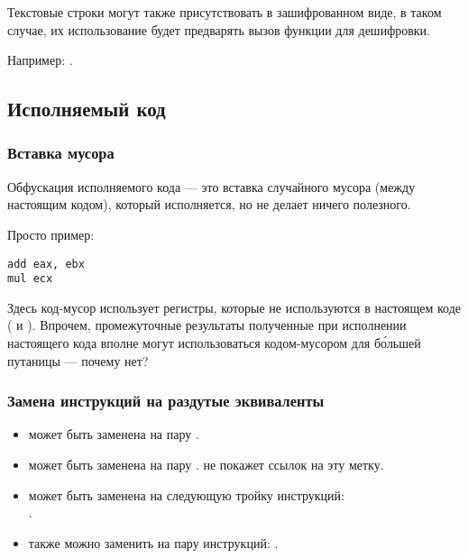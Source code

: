 Текстовые строки могут также присутствовать в зашифрованном виде, в таком случае,
их использование будет предварять вызов функции для дешифровки.

Например: .

\subsection{Исполняемый код}

\subsubsection{Вставка мусора}

Обфускация исполняемого кода --- это вставка случайного мусора (между настоящим кодом), который исполняется, но не делает
ничего полезного.

Просто пример:

\begin{lstlisting}[caption=оригинальный код,style=customasm]
add	eax, ebx
mul	ecx
\end{lstlisting}



Здесь код-мусор использует регистры, которые не используются в настоящем коде ( и ).
Впрочем, промежуточные результаты полученные при исполнении настоящего кода вполне могут использоваться
кодом-мусором для б\'{о}льшей путаницы --- почему нет?

\subsubsection{Замена инструкций на раздутые эквиваленты}

\begin{itemize}
\item {} может быть заменена на пару .
\item {} может быть заменена на пару . 
\IDA{} не покажет ссылок на эту метку.
\item {} может быть заменена на следующую тройку инструкций:\\
.
\item {} также можно заменить на пару инструкций: .
\end{itemize}

